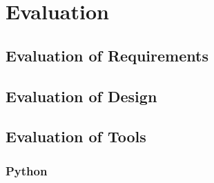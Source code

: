 \chapter{Evaluation}





\section{Evaluation of Requirements}


\section{Evaluation of Design}


\section{Evaluation of Tools}

\subsection{Python}

